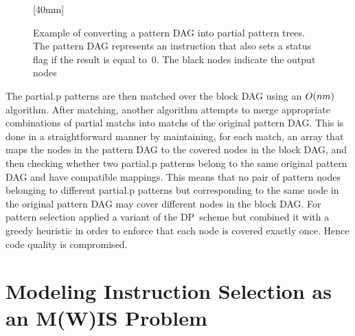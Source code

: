 \begin{figure}
  \mbox{}%
  \hfill%
                [40mm]%
                {%
                }%
  \hfill%
                {%
                  \hspace{1.5em}%
                }%
  \hfill%
  \mbox{}

  \caption[Example of converting a pattern DAG into partial tree patterns]%
          {%
            Example of converting a pattern DAG into partial pattern trees.
            The pattern DAG represents an  instruction that also
            sets a status flag if the result is equal to~0.
            The black nodes indicate the output nodes%
          }
\end{figure}

The \gls{partial.p} \glspl{pattern} are then matched over the \gls{block DAG}
using an \mbox{$O(nm)$} algorithm.
%
After matching, another algorithm attempts to merge appropriate combinations of
partial \glspl{match} into \glspl{match} of the original \gls{pattern DAG}.
%
This is done in a straightforward manner by maintaining, for each \gls{match},
an array that maps the \glspl{node} in the \gls{pattern DAG} to the covered
\glspl{node} in the \gls{block DAG}, and then checking whether two
\gls{partial.p} \glspl{pattern} belong to the same original \gls{pattern DAG}
and have compatible mappings.
%
This means that no pair of \gls{pattern} \glspl{node} belonging to different
\gls{partial.p} \glspl{pattern} but corresponding to the same \gls{node} in the
original \gls{pattern DAG} may cover different \glspl{node} in the \gls{block
  DAG}.
%
For \gls{pattern selection} \citeauthor{ArnoldCorporaal:1999} applied a variant of the
\gls{DP}~scheme but combined it with a greedy heuristic in order to enforce that
each \gls{node} is covered exactly once.
%
Hence code quality is compromised.


\section{Modeling Instruction Selection as an M(W)IS Problem}

